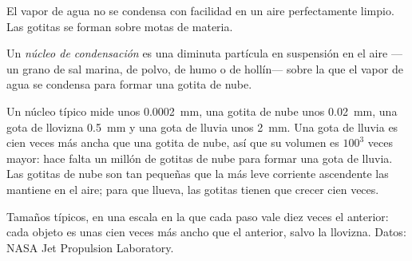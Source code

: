 El vapor de agua no se condensa con facilidad en un aire perfectamente
limpio. Las gotitas se forman sobre motas de materia.

\begin{definition}\label{def:g10:why-clouds-form:nucleus}
Un \emph{núcleo de condensación}
es una diminuta partícula en suspensión en el aire ---un grano de sal
marina, de polvo, de humo o de hollín--- sobre la que el vapor de agua se
condensa para formar una gotita de nube.
\end{definition}

Un núcleo típico mide unos \qty{0.0002}{mm}, una gotita de nube unos
\qty{0.02}{mm}, una gota de llovizna \qty{0.5}{mm} y una gota de lluvia unos
\qty{2}{mm}. Una gota de lluvia es cien veces más ancha que una gotita de
nube, así que su volumen es $100^3$ veces mayor: hace falta un millón de
gotitas de nube para formar una gota de lluvia. Las gotitas de nube son tan
pequeñas que la más leve corriente ascendente las mantiene en el aire; para
que llueva, las gotitas tienen que crecer cien veces.

\begin{omfigure}

{\small Tamaños típicos, en una escala en la que cada paso vale diez veces el
anterior: cada objeto es unas cien veces más ancho que el anterior, salvo la
llovizna. Datos: NASA Jet Propulsion Laboratory.}
\end{omfigure}

